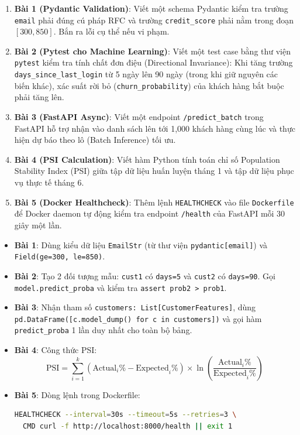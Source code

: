 \begin{baitapbox}
\begin{enumerate}
    \item \textbf{Bài 1 (Pydantic Validation)}: Viết một schema Pydantic kiểm tra trường \texttt{email} phải đúng cú pháp RFC và trường \texttt{credit\_score} phải nằm trong đoạn $[300, 850]$. Bắn ra lỗi cụ thể nếu vi phạm.
    \item \textbf{Bài 2 (Pytest cho Machine Learning)}: Viết một test case bằng thư viện \texttt{pytest} kiểm tra tính chất đơn điệu (Directional Invariance): Khi tăng trường \texttt{days\_since\_last\_login} từ 5 ngày lên 90 ngày (trong khi giữ nguyên các biến khác), xác suất rời bỏ (\texttt{churn\_probability}) của khách hàng bắt buộc phải tăng lên.
    \item \textbf{Bài 3 (FastAPI Async)}: Viết một endpoint \texttt{/predict\_batch} trong FastAPI hỗ trợ nhận vào danh sách lên tới 1,000 khách hàng cùng lúc và thực hiện dự báo theo lô (Batch Inference) tối ưu.
    \item \textbf{Bài 4 (PSI Calculation)}: Viết hàm Python tính toán chỉ số Population Stability Index (PSI) giữa tập dữ liệu huấn luyện tháng 1 và tập dữ liệu phục vụ thực tế tháng 6.
    \item \textbf{Bài 5 (Docker Healthcheck)}: Thêm lệnh \texttt{HEALTHCHECK} vào file \texttt{Dockerfile} để Docker daemon tự động kiểm tra endpoint \texttt{/health} của FastAPI mỗi 30 giây một lần.
\end{enumerate}
\end{baitapbox}

\begin{dapanbox}
\begin{itemize}
    \item \textbf{Bài 1}: Dùng kiểu dữ liệu \texttt{EmailStr} (từ thư viện \texttt{pydantic[email]}) và \texttt{Field(ge=300, le=850)}.
    \item \textbf{Bài 2}: Tạo 2 đối tượng mẫu: \texttt{cust1} có \texttt{days=5} và \texttt{cust2} có \texttt{days=90}. Gọi \texttt{model.predict\_proba} và kiểm tra \texttt{assert prob2 > prob1}.
    \item \textbf{Bài 3}: Nhận tham số \texttt{customers: List[CustomerFeatures]}, dùng \texttt{pd.DataFrame([c.model\_dump() for c in customers])} và gọi hàm \texttt{predict\_proba} 1 lần duy nhất cho toàn bộ bảng.
    \item \textbf{Bài 4}: Công thức PSI:
    \[
    \text{PSI} = \sum_{i=1}^k \left(\text{Actual}_i\% - \text{Expected}_i\%\right) \times \ln\left(\frac{\text{Actual}_i\%}{\text{Expected}_i\%}\right)
    \]
    \item \textbf{Bài 5}: Dòng lệnh trong Dockerfile:
    \begin{lstlisting}[language=bash]
HEALTHCHECK --interval=30s --timeout=5s --retries=3 \
  CMD curl -f http://localhost:8000/health || exit 1
    \end{lstlisting}
\end{itemize}
\end{dapanbox}

